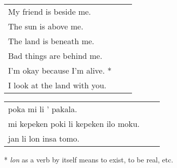 \begin{supertabular}{p{5,5cm}|ll}
    My friend is beside me.       &  & \\ %
    The sun is above me.          &  & \\ %
    The land is beneath me.       &  & \\ %
    Bad things are behind me.     &  & \\ %
    I'm okay because I'm alive. * &  & \\ %
    I look at the land with you.  &  & \\ %
\end{supertabular}

\begin{supertabular}{p{5,5cm}|ll}
    poka mi li ' pakala.                 &  & \\ %
    mi kepeken poki li kepeken ilo moku. &  & \\ %
    jan li lon insa tomo.                &  & \\ %
\end{supertabular}

* \textit{lon} as a verb by itself means to exist, to be real, etc.
%
